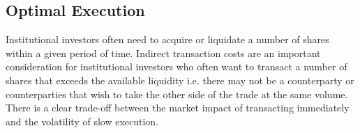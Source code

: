 
\subsection{Optimal Execution}
\label{sec:results_oe}

Institutional investors often need to acquire or liquidate a number of shares within a given period of time. Indirect transaction costs are an important consideration for institutional investors who often want to transact a number of shares that exceeds the available liquidity i.e. there may not be a counterparty or counterparties that wish to take the other side of the trade at the same volume. There is a clear trade-off between the market impact of transacting immediately and the volatility of slow execution. 

